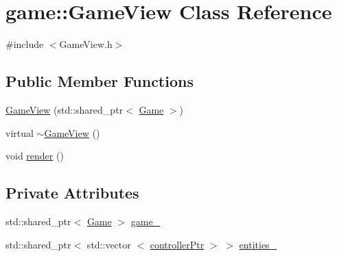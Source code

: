 \hypertarget{classgame_1_1GameView}{\section{game\-:\-:\-Game\-View \-Class \-Reference}
\label{d1/d82/classgame_1_1GameView}
}


{\ttfamily \#include $<$\-Game\-View.\-h$>$}

\subsection*{\-Public \-Member \-Functions}
\begin{DoxyCompactItemize}
\item 
\hyperlink{classgame_1_1GameView_aff7eda7d9091f3f319a8e8370373d048}{\-Game\-View} (std\-::shared\-\_\-ptr$<$ \hyperlink{classgame_1_1Game}{\-Game} $>$)
\item 
virtual \hyperlink{classgame_1_1GameView_ad00299f89a0ecfd967cb56f389747d01}{$\sim$\-Game\-View} ()
\item 
void \hyperlink{classgame_1_1GameView_a788c42134ebe34335a2a8db8c639a2b3}{render} ()
\end{DoxyCompactItemize}
\subsection*{\-Private \-Attributes}
\begin{DoxyCompactItemize}
\item 
std\-::shared\-\_\-ptr$<$ \hyperlink{classgame_1_1Game}{\-Game} $>$ \hyperlink{classgame_1_1GameView_ab2f5d618b746010ecb43798caba340ed}{game\-\_\-}
\item 
std\-::shared\-\_\-ptr$<$ std\-::vector\*
$<$ \hyperlink{Game_8h_a21b04f6cf2d5990b82725fac5ea2ce9a}{controller\-Ptr} $>$ $>$ \hyperlink{classgame_1_1GameView_af7a0cc6b98555b965270c9c0bda31508}{entities\-\_\-}
\end{DoxyCompactItemize}



